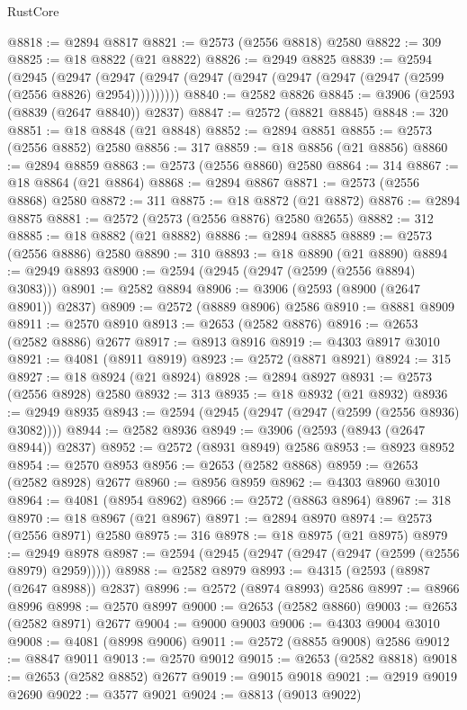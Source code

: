 \begin{lexlean}{RustCore}
\begin{coremodule}
@8818 := @2894 @8817
@8821 := @2573 (@2556 @8818) @2580
@8822 := 309
@8825 := @18 @8822 (@21 @8822)
@8826 := @2949 @8825
@8839 := @2594
    (@2945
      (@2947 (@2947 (@2947 (@2947 (@2947 (@2947 (@2947 (@2947 (@2599 (@2556 @8826) @2954))))))))))
@8840 := @2582 @8826
@8845 := @3906 (@2593 (@8839 (@2647 @8840)) @2837)
@8847 := @2572 (@8821 @8845)
@8848 := 320
@8851 := @18 @8848 (@21 @8848)
@8852 := @2894 @8851
@8855 := @2573 (@2556 @8852) @2580
@8856 := 317
@8859 := @18 @8856 (@21 @8856)
@8860 := @2894 @8859
@8863 := @2573 (@2556 @8860) @2580
@8864 := 314
@8867 := @18 @8864 (@21 @8864)
@8868 := @2894 @8867
@8871 := @2573 (@2556 @8868) @2580
@8872 := 311
@8875 := @18 @8872 (@21 @8872)
@8876 := @2894 @8875
@8881 := @2572 (@2573 (@2556 @8876) @2580 @2655)
@8882 := 312
@8885 := @18 @8882 (@21 @8882)
@8886 := @2894 @8885
@8889 := @2573 (@2556 @8886) @2580
@8890 := 310
@8893 := @18 @8890 (@21 @8890)
@8894 := @2949 @8893
@8900 := @2594 (@2945 (@2947 (@2599 (@2556 @8894) @3083)))
@8901 := @2582 @8894
@8906 := @3906 (@2593 (@8900 (@2647 @8901)) @2837)
@8909 := @2572 (@8889 @8906) @2586
@8910 := @8881 @8909
@8911 := @2570 @8910
@8913 := @2653 (@2582 @8876)
@8916 := @2653 (@2582 @8886) @2677
@8917 := @8913 @8916
@8919 := @4303 @8917 @3010
@8921 := @4081 (@8911 @8919)
@8923 := @2572 (@8871 @8921)
@8924 := 315
@8927 := @18 @8924 (@21 @8924)
@8928 := @2894 @8927
@8931 := @2573 (@2556 @8928) @2580
@8932 := 313
@8935 := @18 @8932 (@21 @8932)
@8936 := @2949 @8935
@8943 := @2594 (@2945 (@2947 (@2947 (@2599 (@2556 @8936) @3082))))
@8944 := @2582 @8936
@8949 := @3906 (@2593 (@8943 (@2647 @8944)) @2837)
@8952 := @2572 (@8931 @8949) @2586
@8953 := @8923 @8952
@8954 := @2570 @8953
@8956 := @2653 (@2582 @8868)
@8959 := @2653 (@2582 @8928) @2677
@8960 := @8956 @8959
@8962 := @4303 @8960 @3010
@8964 := @4081 (@8954 @8962)
@8966 := @2572 (@8863 @8964)
@8967 := 318
@8970 := @18 @8967 (@21 @8967)
@8971 := @2894 @8970
@8974 := @2573 (@2556 @8971) @2580
@8975 := 316
@8978 := @18 @8975 (@21 @8975)
@8979 := @2949 @8978
@8987 := @2594 (@2945 (@2947 (@2947 (@2947 (@2599 (@2556 @8979) @2959)))))
@8988 := @2582 @8979
@8993 := @4315 (@2593 (@8987 (@2647 @8988)) @2837)
@8996 := @2572 (@8974 @8993) @2586
@8997 := @8966 @8996
@8998 := @2570 @8997
@9000 := @2653 (@2582 @8860)
@9003 := @2653 (@2582 @8971) @2677
@9004 := @9000 @9003
@9006 := @4303 @9004 @3010
@9008 := @4081 (@8998 @9006)
@9011 := @2572 (@8855 @9008) @2586
@9012 := @8847 @9011
@9013 := @2570 @9012
@9015 := @2653 (@2582 @8818)
@9018 := @2653 (@2582 @8852) @2677
@9019 := @9015 @9018
@9021 := @2919 @9019 @2690
@9022 := @3577 @9021
@9024 := @8813 (@9013 @9022)

\end{coremodule}
\end{lexlean}
